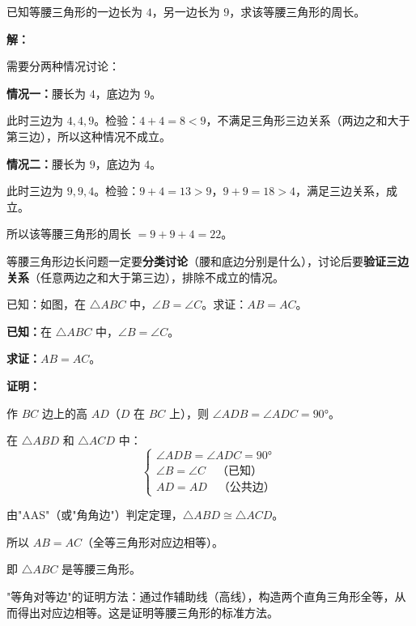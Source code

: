 \documentclass[12pt, a4paper]{ctexart}
\begin{document}
\begin{examplebox}
已知等腰三角形的一边长为 $4$，另一边长为 $9$，求该等腰三角形的周长。
\end{examplebox}

\textbf{解：}

需要分两种情况讨论：

\textbf{情况一：}腰长为 $4$，底边为 $9$。

此时三边为 $4, 4, 9$。检验：$4 + 4 = 8 < 9$，不满足三角形三边关系（两边之和大于第三边），所以这种情况不成立。

\textbf{情况二：}腰长为 $9$，底边为 $4$。

此时三边为 $9, 9, 4$。检验：$9 + 4 = 13 > 9$，$9 + 9 = 18 > 4$，满足三边关系，成立。

所以该等腰三角形的周长 $= 9 + 9 + 4 = 22$。

\begin{tipbox}[方法总结]
等腰三角形边长问题一定要\textbf{分类讨论}（腰和底边分别是什么），讨论后要\textbf{验证三边关系}（任意两边之和大于第三边），排除不成立的情况。
\end{tipbox}

\begin{examplebox}
已知：如图，在 $\triangle ABC$ 中，$\angle B = \angle C$。求证：$AB = AC$。
\end{examplebox}

\textbf{已知：}在 $\triangle ABC$ 中，$\angle B = \angle C$。

\textbf{求证：}$AB = AC$。

\textbf{证明：}

作 $BC$ 边上的高 $AD$（$D$ 在 $BC$ 上），则 $\angle ADB = \angle ADC = 90°$。

在 $\triangle ABD$ 和 $\triangle ACD$ 中：
$$\left\{\begin{array}{l}
\angle ADB = \angle ADC = 90° \\
\angle B = \angle C \quad \text{（已知）} \\
AD = AD \quad \text{（公共边）}
\end{array}\right.$$

由"AAS"（或"角角边"）判定定理，$\triangle ABD \cong \triangle ACD$。

所以 $AB = AC$（全等三角形对应边相等）。

即 $\triangle ABC$ 是等腰三角形。

\begin{tipbox}[方法总结]
"等角对等边"的证明方法：通过作辅助线（高线），构造两个直角三角形全等，从而得出对应边相等。这是证明等腰三角形的标准方法。
\end{tipbox}
\end{document}
